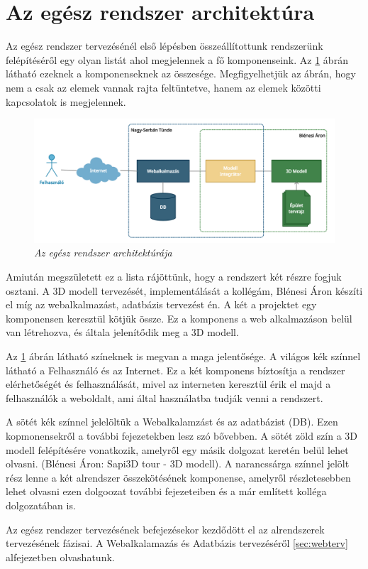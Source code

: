 \section{Az egész rendszer architektúra}
\label{sec:rendterv}

Az egész rendszer tervezésénél első lépésben összeállítottunk rendszerünk felépítéséről egy olyan listát ahol megjelennek a fő komponenseink. Az \ref{fig:systemArchBig} ábrán látható ezeknek a komponenseknek az összesége. Megfigyelhetjük az ábrán, hogy nem a csak az elemek vannak rajta feltüntetve, hanem az elemek közötti kapcsolatok is megjelennek.
\begin{figure}[H]
	\centering
	\includegraphics[width=1\linewidth]{figures/images/kozosfazis.png}
	\caption[Az egész rendszer architektúrája]{\textit{Az egész rendszer architektúrája}}
	\label{fig:systemArchBig}
\end{figure}

Amiután megszületett ez a lista rájöttünk, hogy a rendszert két részre fogjuk osztani. A 3D modell tervezését, implementálását a kollégám, Blénesi Áron készíti el míg az webalkalmazást, adatbázis tervezést én. A két a projektet egy komponensen keresztül kötjük össze. Ez a komponens a web alkalmazáson belül van létrehozva, és általa jelenítődik meg a 3D modell.

Az \ref{fig:systemArchBig} ábrán látható színeknek is megvan a maga jelentősége. A világos kék színnel látható a Felhasználó és az Internet. Ez a két komponens bíztosítja a rendszer elérhetőségét és felhasználását, mivel az interneten keresztül érik el majd a felhasználók a weboldalt, ami által használatba tudják venni a rendszert.

A sötét kék színnel jelelöltük a Webalkalamzást és az adatbázist (DB). Ezen kopmonensekről a további fejezetekben lesz szó bővebben. A sötét zöld szín a 3D modell felépítésére vonatkozik, amelyről egy másik dolgozat keretén belül lehet olvasni. (Blénesi Áron: Sapi3D tour - 3D modell). A narancssárga színnel jelölt rész lenne a két alrendszer összekötésének komponense, amelyről részletesebben lehet olvasni ezen dolgoozat további fejezeteiben és a már említett kolléga dolgozatában is.

Az egész rendszer tervezésének befejezésekor kezdődött el az alrendszerek tervezésének fázisai. A Webalkalamazás és Adatbázis tervezéséről \ref{sec:webterv} alfejezetben olvashatunk.